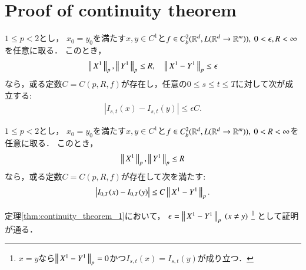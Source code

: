 \section{Proof of continuity theorem}
	\begin{screen}
		\begin{thm}\label{thm:continuity_theorem_1}
			$1 \leq p < 2$とし，
			$x_0 = y_0$を満たす$x,y \in C^1$と$f \in C^2_b(\mathbb{R}^d,L(\mathbb{R}^d \rightarrow \mathbb{R}^m)),\ 0 < \epsilon, R < \infty$を任意に取る．
			このとき，
			\begin{align}
				\left\|\, X^1\, \right\|_{p},\left\|\, Y^1\, \right\|_{p} \leq R,
				\quad \left\|\, X^1 - Y^1\, \right\|_{p} \leq \epsilon
			\end{align}
			なら，或る定数$C = C(p,R,f)$が存在し，任意の$0 \leq s \leq t \leq T$に対して次が成立する:
			\begin{align}
				\left| I_{s,t}(x) - I_{s,t}(y) \right| \leq \epsilon C.
			\end{align}
		\end{thm}
	\end{screen}
	
	\begin{screen}
		\begin{cor}[$p$-variationによる閉球上のLipschitz連続性]\label{cor:continuity_theorem_1}
			$1 \leq p < 2$とし，
			$x_0 = y_0$を満たす$x,y \in C^1$と$f \in C^2_b(\mathbb{R}^d,L(\mathbb{R}^d \rightarrow \mathbb{R}^m)),\ 0 < R < \infty$を任意に取る．
			このとき，
			\begin{align}
				\left\|\, X^1\, \right\|_{p},\left\|\, Y^1\, \right\|_{p} \leq R
			\end{align}
			なら，或る定数$C = C(p,R,f)$が存在して次を満たす:
			\begin{align}
				\left| I_{0,T}(x) - I_{0,T}(y) \right| \leq C\left\|\, X^1 - Y^1\, \right\|_{p}.
			\end{align}
		\end{cor}
	\end{screen}
	
	\begin{prf}
		定理\ref{thm:continuity_theorem_1}において，
		$\epsilon = \left\|\, X^1 - Y^1\, \right\|_{p}\ (x \neq y)$
		\footnote{
			$x=y$なら$\left\|\, X^1 - Y^1\, \right\|_{p} = 0$かつ$I_{s,t}(x) = I_{s,t}(y)$が成り立つ．
		}
		として証明が通る．
		\QED
	\end{prf}
	
